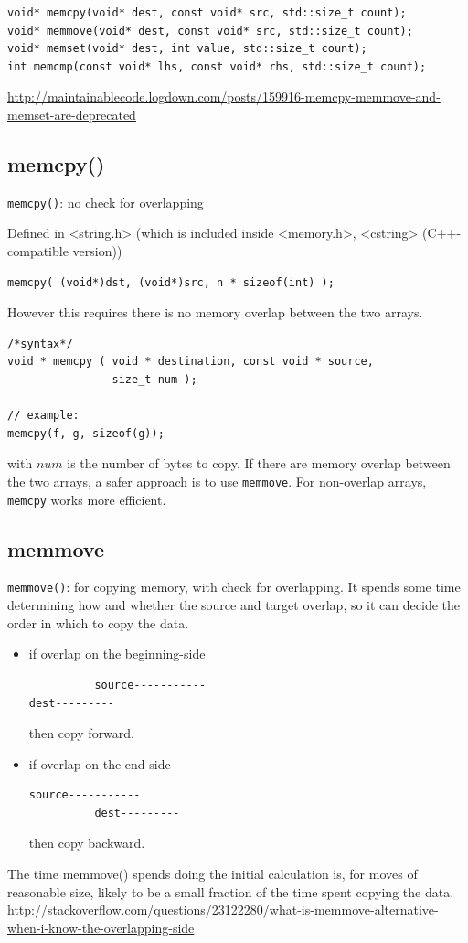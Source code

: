 \begin{lstlisting}
void* memcpy(void* dest, const void* src, std::size_t count);
void* memmove(void* dest, const void* src, std::size_t count);
void* memset(void* dest, int value, std::size_t count);
int memcmp(const void* lhs, const void* rhs, std::size_t count);
\end{lstlisting}
\url{http://maintainablecode.logdown.com/posts/159916-memcpy-memmove-and-memset-are-deprecated}





\subsection{memcpy()}
\label{sec:memcpy()}

 \verb!memcpy()!: no check for overlapping
  
Defined in <string.h> (which is included inside <memory.h>, <cstring>
(C++-compatible version))
\begin{lstlisting}
memcpy( (void*)dst, (void*)src, n * sizeof(int) );
\end{lstlisting}

However this requires there is no memory overlap between the two arrays.
\begin{lstlisting}
/*syntax*/
void * memcpy ( void * destination, const void * source, 
                size_t num );

// example:
memcpy(f, g, sizeof(g));
\end{lstlisting}
with $num$ is the number of bytes to copy.  If there are memory
overlap between the two arrays, a safer approach is to use
\verb!memmove!. For non-overlap arrays, \verb!memcpy! works more
efficient. 

\subsection{memmove}
\label{sec:memmove}

\verb!memmove()!: for copying memory,  with check for overlapping.
It spends some time determining how and whether the source and target overlap,
so it can decide the order in which to copy the data.
\begin{itemize}
  \item if overlap on the beginning-side
\begin{verbatim}
          source-----------
dest---------
\end{verbatim}
then copy forward.

  \item if overlap on the end-side
\begin{verbatim}
source-----------
          dest---------
\end{verbatim}
then copy backward.

\end{itemize}
The time memmove() spends doing the initial calculation is, for moves of
reasonable size, likely to be a small fraction of the time spent copying the data.
\url{http://stackoverflow.com/questions/23122280/what-is-memmove-alternative-when-i-know-the-overlapping-side}


